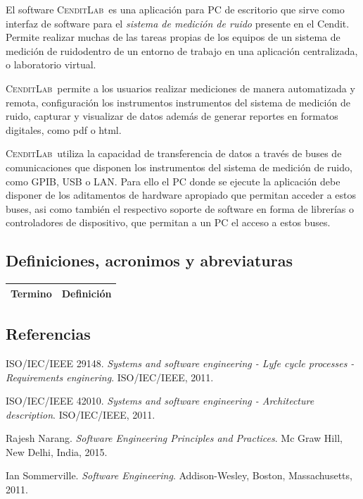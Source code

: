 \documentclass[paper=a4,oneside,fontsize=12pt]{article}
\newcommand{\AppName}{\textsc{CenditLab}\ }
\newcommand{\smr}{sistema de medición de ruido}
\newcommand{\cendit}{Cendit}
\begin{document}
	El software \AppName es una aplicación para PC de escritorio que sirve como interfaz de software para el \emph{\smr} presente en el \cendit. Permite realizar muchas de las tareas propias de los equipos de un \smr dentro de un entorno de trabajo en una aplicación centralizada, o laboratorio virtual. 
	
	\AppName permite a los usuarios realizar mediciones de manera automatizada y remota, configuración los instrumentos instrumentos del \smr, capturar y visualizar de datos además de generar reportes en formatos digitales, como pdf o html.
	
	\AppName utiliza la capacidad de transferencia de datos a través de buses de comunicaciones que disponen los instrumentos del \smr, como GPIB, USB o LAN. Para ello el PC donde se ejecute la aplicación debe disponer de los aditamentos de hardware apropiado que permitan acceder a estos buses, asi como también el respectivo soporte de software en forma de librerías o controladores de dispositivo, que permitan a un PC el acceso a estos buses.
	
	\subsection{Definiciones, acronimos y abreviaturas}
	
	\begin{table}[h!]
		\begin{tabular}{|p{4cm}|p{10cm}|} 
			\hline
			Termino & Definición \\
			\hline
		\end{tabular}	
	\end{table}

	\subsection{Referencias}
	
	
	\begingroup
		\renewcommand{\section}[2]{}
		\begin{thebibliography}{9}
			ISO/IEC/IEEE 29148. 
			\textit{Systems and software engineering - Lyfe cycle processes - Requirements enginering}. 
			ISO/IEC/IEEE, 2011.
			
			ISO/IEC/IEEE 42010. 
			\textit{Systems and software engineering - Architecture description}. 
			ISO/IEC/IEEE, 2011.		
			
			Rajesh Narang. 
			\textit{Software Engineering Principles and Practices}. 
			Mc Graw Hill, New Delhi, India, 2015.			
			
			Ian Sommerville. 
			\textit{Software Engineering}. 
			Addison-Wesley, Boston, Massachusetts, 2011.				

		\end{thebibliography}
	\endgroup
\end{document}
